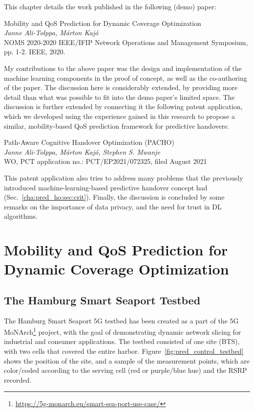 	This chapter details the work published in the following (demo) paper:
	
	\begin{publication}
		Mobility and QoS Prediction for Dynamic Coverage Optimization \\
		\textit{Janne Ali-Tolppa, Márton Kajó} \\
		NOMS 2020-2020 IEEE/IFIP Network Operations and Management Symposium, pp. 1-2. IEEE, 2020.
	\end{publication}

	My contributions to the above paper was the design and implementation of the machine learning components in the proof of concept, as well as the co-authoring of the paper.
	The discussion here is considerably extended, by providing more detail than what was possible to fit into the demo paper's limited space.
	The discussion is further extended by connecting it the following patent application, which we developed using the experience gained in this research to propose a similar, mobility-based \ac{QoS} prediction framework for predictive handovers:

	\begin{patent}
		Path-Aware Cognitive Handover Optimization (PACHO) \\
		\textit{Janne Ali-Tolppa, Márton Kajó, Stephen S. Mwanje} \\
		WO, PCT application no.: PCT/EP2021/072325, filed August 2021
	\end{patent}

	This patent application also tries to address many problems that the previously introduced machine-learning-based predictive handover concept had (Sec.~\ref{cha:pred_ho:sec:crit}).
	Finally, the discussion is concluded by some remarks on the importance of data privacy, and the need for trust in \ac{DL} algorithms.
	
	\section{Mobility and QoS Prediction for Dynamic Coverage Optimization}
	
		\subsection{The Hamburg Smart Seaport Testbed}
			
			The Hamburg Smart Seaport 5G testbed has been created as a part of the \ac{5G MoNArch}\footnote{\url{https://5g-monarch.eu/smart-sea-port-use-case/}} project, with the goal of demonstrating dynamic network slicing for industrial and consumer applications.
			The testbed consisted of one site (\ac{BTS}), with two cells that covered the entire harbor.
			Figure~\ref{fig:pred_control_testbed} shows the position of the site, and a sample of the measurement points, which are color/coded according to the serving cell (red or purple/blue hue) and the \ac{RSRP} recorded.
			
